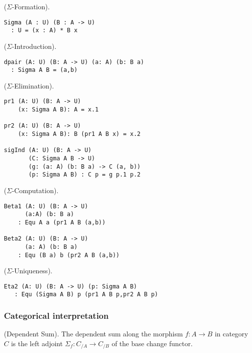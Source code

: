 \documentclass{article}
\begin{document}
\begin{definition} ($\Sigma$-Formation).
\begin{lstlisting}
Sigma (A : U) (B : A -> U)
  : U = (x : A) * B x
\end{lstlisting}
\end{definition}

\begin{definition} ($\Sigma$-Introduction).
\begin{lstlisting}
dpair (A: U) (B: A -> U) (a: A) (b: B a)
  : Sigma A B = (a,b)
\end{lstlisting}
\end{definition}

\begin{definition} ($\Sigma$-Elimination).
\begin{lstlisting}
pr1 (A: U) (B: A -> U)
    (x: Sigma A B): A = x.1

pr2 (A: U) (B: A -> U)
    (x: Sigma A B): B (pr1 A B x) = x.2

sigInd (A: U) (B: A -> U)
       (C: Sigma A B -> U)
       (g: (a: A) (b: B a) -> C (a, b))
       (p: Sigma A B) : C p = g p.1 p.2
\end{lstlisting}
\end{definition}

\begin{theorem} ($\Sigma$-Computation).
\begin{lstlisting}
Beta1 (A: U) (B: A -> U)
      (a:A) (b: B a)
    : Equ A a (pr1 A B (a,b))

Beta2 (A: U) (B: A -> U)
      (a: A) (b: B a)
    : Equ (B a) b (pr2 A B (a,b))
\end{lstlisting}
\end{theorem}

\begin{theorem} ($\Sigma$-Uniqueness).
\begin{lstlisting}
Eta2 (A: U) (B: A -> U) (p: Sigma A B)
   : Equ (Sigma A B) p (pr1 A B p,pr2 A B p)
\end{lstlisting}
\end{theorem}

\subsubsection*{Categorical interpretation}

\begin{definition} (Dependent Sum).
The dependent sum along the morphism $f: A \rightarrow B$ in category $C$ is the left
adjoint $\Sigma_f : C_{/A} \rightarrow C_{/B}$ of the base change functor.
\end{definition}
\end{document}

